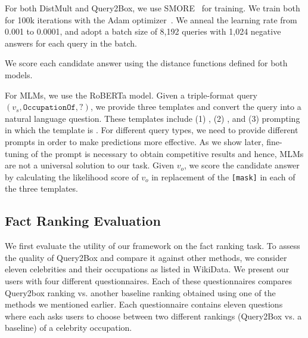 For both DistMult and Query2Box, we use SMORE~\cite{ren2021smore} for training. We train both for 100k iterations with the Adam optimizer~\cite{kingma2014adam}. We anneal the learning rate from 0.001 to 0.0001, and adopt a batch size of 8,192 queries with 1,024 negative answers for each query in the batch.

We score each candidate answer using the distance functions defined for both models.

For MLMs, we use the RoBERTa model. Given a triple-format query $(v_s, \texttt{OccupationOf}, ?)$, we provide three templates and convert the query into a natural language question. These templates include (1) , (2) , and (3) prompting~\cite{wei2021why} in which the template is . For different query types, we need to provide different prompts in order to make predictions more effective. As we show later, fine-tuning of the prompt is necessary to obtain competitive results and hence, MLMs are not a universal solution to our task. Given $v_o$, we score the candidate answer by calculating the likelihood score of $v_o$ in replacement of the \texttt{[mask]} in each of the three templates.


\subsection{Fact Ranking Evaluation}

We first evaluate the utility of our framework on the fact ranking task. To assess the quality of Query2Box and compare it against other methods, we consider eleven celebrities and their occupations as listed in WikiData. We present our users with four different questionnaires. Each of these questionnaires compares Query2box ranking vs. another baseline ranking obtained using one of the methods we mentioned earlier. Each questionnaire contains eleven questions where each asks users to choose between two different rankings (Query2Box vs. a baseline) of a celebrity occupation.


